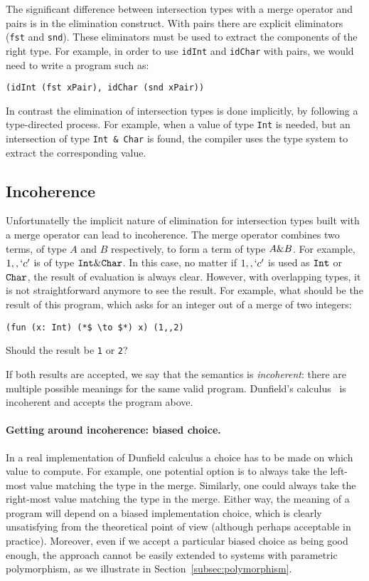 \noindent The significant difference between intersection types with a
merge operator and pairs is in the elimination construct. With pairs
there are explicit eliminators (\lstinline{fst} and
\lstinline{snd}). These eliminators must be used to extract the
components of the right type. For example, in order to use
\lstinline{idInt} and \lstinline{idChar} with pairs, we would need to
write a program such as:

\begin{lstlisting}
(idInt (fst xPair), idChar (snd xPair))
\end{lstlisting}

\noindent In contrast the elimination of intersection types is done
implicitly, by following a type-directed process. For example,
when a value of type \lstinline{Int} is needed, but an intersection
of type \lstinline{Int & Char} is found, the compiler uses the
type system to extract the corresponding value.

\subsection{Incoherence}\label{subsec:incoherence}
Unfortunatelly the implicit nature of elimination for intersection
types built with a merge operator can lead to incoherence.
The merge operator combines two terms, of type $A$ and $B$
respectively, to form a term of type $A \& B$. For example,
$1 ,, `c'$ is of type $\texttt{Int} \& \texttt{Char}$. In this case, no
matter if $1 ,, `c'$ is used as $\texttt{Int}$ or $\texttt{Char}$, the result
of evaluation is always clear. However, with overlapping types, it is
not straightforward anymore to see the result. For example, what
should be the result of this program, which asks for an integer out of
a merge of two integers:
\begin{lstlisting}
(fun (x: Int) (*$ \to $*) x) (1,,2)
\end{lstlisting}
Should the result be \lstinline$1$ or \lstinline$2$?

If both results are accepted, we say that the semantics is
\emph{incoherent}: there are multiple possible meanings for the same
valid program. Dunfield's calculus~\cite{dunfield2014elaborating} is incoherent and accepts the
program above.

\paragraph{Getting around incoherence: biased choice.}
In a real implementation of Dunfield calculus a choice has to be made
on which value to compute. For example, one potential option is to
always take the left-most value matching the type in the
merge. Similarly, one could always take the right-most
value matching the type in the merge. Either way, the meaning
of a program will depend on a biased implementation choice,
which is clearly unsatisfying from the theoretical point of view
(although perhaps acceptable in practice).
Moreover, even if we accept a particular biased choice as
being good enough, the approach cannot be easily
extended to systems with parametric polymorphism, as we illustrate
in Section~\ref{subsec:polymorphism}.

